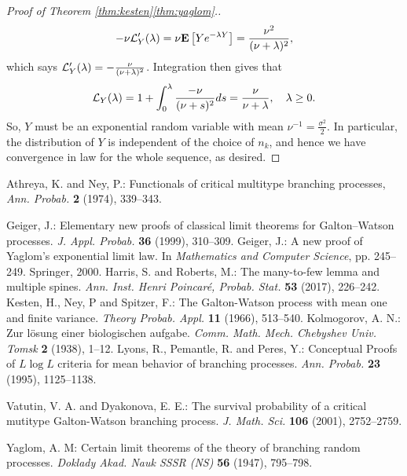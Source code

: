 \documentclass[12pt]{amsart}
\numberwithin{equation}{section}
\newcommand{\brac}[1]{\left[ #1 \right]}
\newcommand{\expct}{\mathbf E}
\begin{document}
\begin{proof}[Proof of Theorem \ref{thm:kesten}\eqref{thm:yaglom}.]
\begin{equation*}
	    -\nu\cL_Y'(\lambda)
	=
	    \nu\expct\brac{Ye^{-\lambda Y}}
    =	
		\frac{\nu^2}{(\nu+\lambda)^2},
\end{equation*}
	which says $\mathcal L_Y'(\lambda)=-\frac{\nu}{(\nu+\lambda)^2}$.
	Integration then gives that
\begin{equation*}
	    \mathcal L_Y(\lambda)
	=
	    1
	+
	    \int_0^\lambda\frac{-\nu}{(\nu+s)^2}ds
	=
		\frac{\nu}{\nu+\lambda},
		\quad
		\lambda \ge 0.
	\end{equation*}
	So, $Y$ must be an 	exponential random variable
	with mean $\nu^{-1}=\frac{\sigma^2}{2}$.
	In particular, the distribution of $Y$
	is independent of the choice of $n_k$, and hence we have convergence in law for the whole sequence, as desired.
\end{proof}
\vspace{.1in}
\begin{thebibliography}{99}

 Athreya, K.  and  Ney, P.: Functionals of critical multitype branching processes, {\it Ann.
Probab.} {\bf 2} (1974), 339--343.

	Geiger, J.:
	Elementary new proofs of classical limit theorems for Galton--Watson processes.
	{\it J. Appl. Probab.} \textbf{36} (1999), 310--309.
	Geiger, J.:
	A new proof of Yaglom's exponential limit law.
	In {\it Mathematics and Computer Science}, pp. 245--249.
	Springer, 2000.
	Harris, S. and Roberts, M.:
	The many-to-few lemma and multiple spines.
	{\it Ann.  Inst. Henri Poincar{\'e}, Probab. Stat.}
	\textbf{53} (2017), 226--242.
	Kesten, H.,  Ney, P and Spitzer, F.:
	The Galton-Watson process with mean one and finite variance.
	{\it Theory Probab. Appl.}
	\textbf{11} (1966), 513--540.
	Kolmogorov, A. N.:
	Zur l{\"o}sung einer biologischen aufgabe.
	{\it Comm. Math. Mech. Chebyshev Univ. Tomsk}
	\textbf{2} (1938), 1--12.
	Lyons, R.,  Pemantle, R. and Peres, Y.:
	Conceptual Proofs of $ L \log L $ criteria for mean behavior of branching processes.
	{\it Ann. Probab.} \textbf{23} (1995), 1125--1138.

 Vatutin, V. A. and Dyakonova,  E. E.: The survival probability of a critical mutitype Galton-Watson branching process.
{\it J.  Math. Sci.} \textbf{106} (2001), 2752--2759.

	Yaglom, A. M:
	Certain limit theorems of the theory of branching random processes.
	{\it Doklady Akad. Nauk SSSR (NS)} \textbf{56} (1947), 795--798.
\end{thebibliography}
\end{document}
